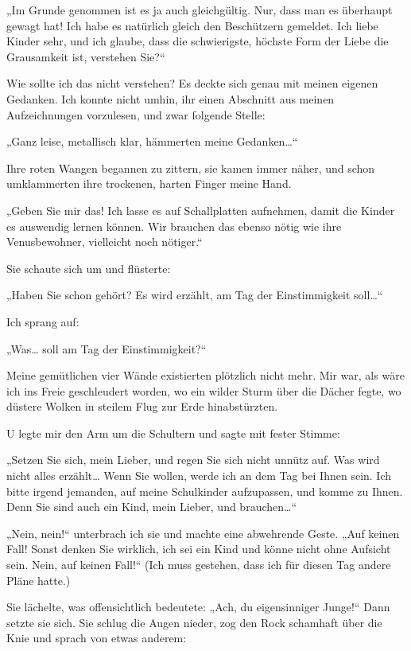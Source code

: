 „Im Grunde genommen ist es ja auch gleichgültig. Nur, dass man
es überhaupt gewagt hat! Ich habe es natürlich gleich den
Beschützern gemeldet. Ich liebe Kinder sehr, und ich glaube, dass
die schwierigste, höchste Form der Liebe die Grausamkeit ist,
verstehen Sie?“

Wie sollte ich das nicht verstehen? Es deckte sich
genau mit meinen eigenen Gedanken. Ich konnte nicht umhin, ihr
einen Abschnitt aus meinen Aufzeichnungen vorzulesen, und zwar
folgende Stelle:

„Ganz leise, metallisch klar, hämmerten meine Gedanken\ldots{}“

Ihre roten Wangen begannen zu zittern, sie kamen immer näher, und
schon umklammerten ihre trockenen, harten Finger meine Hand.

„Geben Sie mir das! Ich lasse es auf Schallplatten aufnehmen, damit
die Kinder es auswendig lernen können. Wir brauchen das ebenso
nötig wie ihre Venusbewohner, vielleicht noch nötiger.“

Sie schaute sich um und flüsterte:

„Haben Sie schon gehört? Es wird erzählt, am Tag der Einstimmigkeit
soll\ldots{}“

Ich sprang auf:

„Was\ldots{} soll am Tag der Einstimmigkeit?“

Meine gemütlichen vier
Wände existierten plötzlich nicht mehr. Mir war, als wäre ich ins
Freie geschleudert worden, wo ein wilder Sturm über die Dächer
fegte, wo düstere Wolken in steilem Flug zur Erde hinabstürzten.

U legte mir den Arm um die Schultern und sagte mit fester Stimme:

„Setzen Sie sich, mein Lieber, und regen Sie sich nicht unnütz auf.
Was wird nicht alles erzählt\ldots{} Wenn Sie wollen, werde ich an dem
Tag bei Ihnen sein. Ich bitte irgend jemanden, auf meine
Schulkinder aufzupassen, und komme zu Ihnen. Denn Sie sind auch ein
Kind, mein Lieber, und brauchen\ldots{}“

„Nein, nein!“ unterbrach ich sie und machte eine abwehrende Geste.
„Auf keinen Fall! Sonst denken Sie wirklich, ich sei ein Kind und
könne nicht ohne Aufsicht sein. Nein, auf keinen Fall!“ (Ich muss
gestehen, dass ich für diesen Tag andere Pläne hatte.)

Sie lächelte, was offensichtlich bedeutete: „Ach, du eigensinniger
Junge!“ Dann setzte sie sich. Sie schlug die Augen nieder, zog den
Rock schamhaft über die Knie und sprach von etwas anderem:

